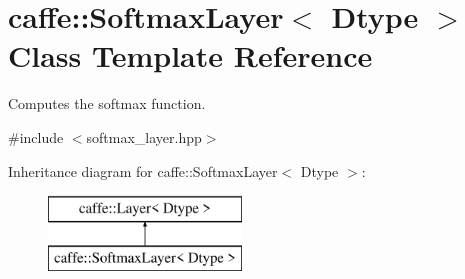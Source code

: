 \hypertarget{classcaffe_1_1SoftmaxLayer}{}\section{caffe\+:\+:Softmax\+Layer$<$ Dtype $>$ Class Template Reference}
\label{classcaffe_1_1SoftmaxLayer}


Computes the softmax function.  




{\ttfamily \#include $<$softmax\+\_\+layer.\+hpp$>$}

Inheritance diagram for caffe\+:\+:Softmax\+Layer$<$ Dtype $>$\+:\begin{figure}[H]
\begin{center}
\leavevmode
\includegraphics[height=2.000000cm]{classcaffe_1_1SoftmaxLayer}
\end{center}
\end{figure}
